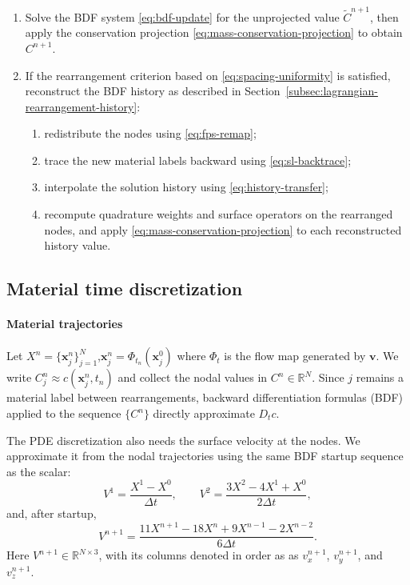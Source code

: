 \documentclass[a4paper,fleqn]{cas-sc}
\begin{document}
\begin{algorithm}[t]
\begin{enumerate}
  \item Solve the BDF system \eqref{eq:bdf-update} for the unprojected value
  $\widetilde C^{n+1}$, then apply the conservation projection
  \eqref{eq:mass-conservation-projection} to obtain $C^{n+1}$.

  \item If the rearrangement criterion based on
  \eqref{eq:spacing-uniformity} is satisfied, reconstruct the BDF history as
  described in Section~\ref{subsec:lagrangian-rearrangement-history}:
  \begin{enumerate}
    \item redistribute the nodes using \eqref{eq:fps-remap};
    \item trace the new material labels backward using \eqref{eq:sl-backtrace};
    \item interpolate the solution history using \eqref{eq:history-transfer};
    \item recompute quadrature weights and surface operators on the rearranged
    nodes, and apply \eqref{eq:mass-conservation-projection} to each
    reconstructed history value.
  \end{enumerate}
\end{enumerate}
\end{algorithm}

\subsection{Material time discretization}
\label{subsec:bdf-lagrangian-eulerian}
\paragraph{Material trajectories}
Let $
  X^n=\{\bm x_j^n\}_{j=1}^N$,$
  \bm x_j^n=\Phi_{t_n}(\bm x_j^0)$
where $\Phi_t$ is the flow map generated by $\bm v$.  We write
$C_j^n\approx c(\bm x_j^n,t_n)$ and collect the nodal values in
$C^n\in\mathbb R^N$.  Since $j$ remains a material label between
rearrangements, backward differentiation formulas (BDF) applied to the
sequence $\{C^n\}$ directly approximate $D_t c$.

The PDE discretization also needs the surface velocity at the nodes.  We
approximate it from the nodal trajectories using the same BDF startup
sequence as the scalar:
\[
  V^1=\frac{X^1-X^0}{\Delta t},\qquad
  V^2=\frac{3X^2-4X^1+X^0}{2\Delta t},
\]
and, after startup,
\[
  V^{n+1}
  =
  \frac{11X^{n+1}-18X^n+9X^{n-1}-2X^{n-2}}{6\Delta t}.
\]
Here $V^{n+1}\in\mathbb R^{N\times 3}$, with its columns denoted in order as as $v_x^{n+1}$, $v_y^{n+1}$, and $v_z^{n+1}$.
\end{document}
